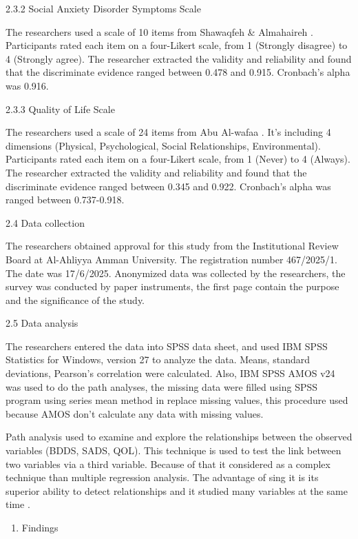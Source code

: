 \documentclass[10pt]{NSP1}
\begin{document}
2.3.2 Social Anxiety Disorder Symptoms Scale

The researchers used a scale of 10 items from Shawaqfeh \& Almahaireh \cite{ref13}. Participants rated each item on a four-Likert scale, from 1 (Strongly disagree) to 4 (Strongly agree). The researcher extracted the validity and reliability and found that the discriminate evidence ranged between 0.478 and 0.915. Cronbach’s alpha was 0.916.

2.3.3 Quality of Life Scale

The researchers used a scale of 24 items from Abu Al-wafaa \cite{ref14}. It’s including 4 dimensions (Physical, Psychological, Social Relationships, Environmental). Participants rated each item on a four-Likert scale, from 1 (Never) to 4 (Always). The researcher extracted the validity and reliability and found that the discriminate evidence ranged between 0.345 and 0.922. Cronbach’s alpha was ranged between 0.737-0.918.

2.4 Data collection

The researchers obtained approval for this study from the Institutional Review Board at Al-Ahliyya Amman University. The registration number 467/2025/1. The date was 17/6/2025. Anonymized data was collected by the researchers, the survey was conducted by paper instruments, the first page contain the purpose and the significance of the study.

2.5 Data analysis

The researchers entered the data into SPSS data sheet, and used IBM SPSS Statistics for Windows, version 27 to analyze the data. Means, standard deviations, Pearson’s correlation were calculated. Also, IBM SPSS AMOS v24 was used to do the path analyses, the missing data were filled using SPSS program using series mean method in replace missing values, this procedure used because AMOS don’t calculate any data with missing values.

Path analysis used to examine and explore the relationships between the observed variables (BDDS, SADS, QOL). This technique is used to test the link between two variables via a third variable. Because of that it considered as a complex technique than multiple regression analysis. The advantage of sing it is its superior ability to detect relationships and it studied many variables at the same time \cite{ref15}.

\begin{enumerate}
  \item Findings
\end{enumerate}
\end{document}
